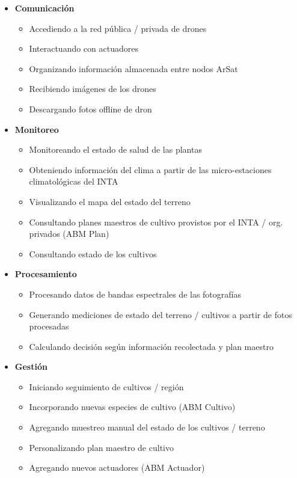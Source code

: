 \begin{itemize} \itemsep -2pt
    \item \textbf{Comunicación}
    \begin{itemize} \itemsep -2pt
        \item Accediendo a la red pública / privada de drones
		\item Interactuando con actuadores
		\item Organizando información almacenada entre nodos ArSat
        \item Recibiendo imágenes de los drones
		\item Descargando fotos offline de dron
    \end{itemize}
    \item \textbf{Monitoreo}
    \begin{itemize} \itemsep -2pt
        \item Monitoreando el estado de salud de las plantas
		\item Obteniendo información del clima a partir de las micro-estaciones climatológicas del INTA
		\item Visualizando el mapa del estado del terreno
		\item Consultando planes maestros de cultivo provistos por el INTA / org. privados (ABM Plan)
		\item Consultando estado de los cultivos
    \end{itemize}
    \item \textbf{Procesamiento}
    \begin{itemize} \itemsep -2pt
    	\item Procesando datos de bandas espectrales de las fotografías
		\item Generando mediciones de estado del terreno / cultivos a partir de fotos procesadas
        \item Calculando decisión según información recolectada y plan maestro
    \end{itemize}
    \item \textbf{Gestión}
    \begin{itemize} \itemsep -2pt
		\item Iniciando seguimiento de cultivos / región
		\item Incorporando nuevas especies de cultivo (ABM Cultivo)
		\item Agregando muestreo manual del estado de los cultivos / terreno
		\item Personalizando plan maestro de cultivo
		\item Agregando nuevos actuadores (ABM Actuador)

\end{itemize}
\end{itemize}

